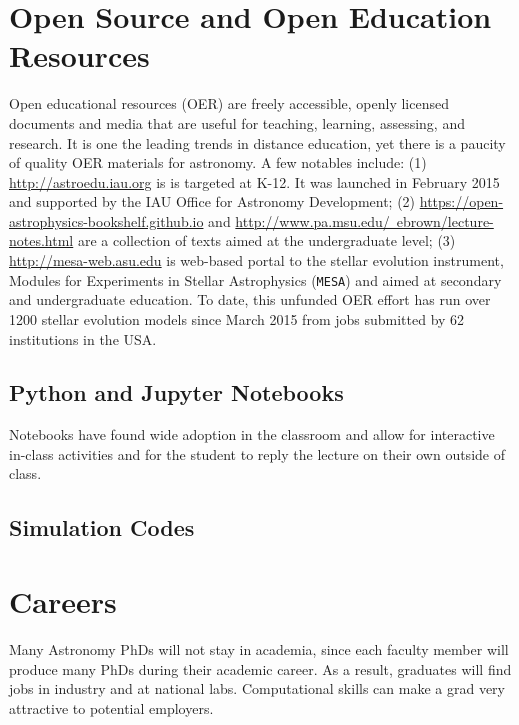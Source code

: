 \documentclass[11pt]{article}
\begin{document}
\section{Open Source and Open Education Resources}
Open educational resources (OER) are freely accessible, openly
licensed documents and media that are useful for teaching, learning,
assessing, and research. It is one the leading trends in distance education,
yet there is a paucity of quality OER materials for astronomy. A few notables
include:
(1) \href{http://astroedu.iau.org}{http://astroedu.iau.org} is 
is targeted at K-12. It was launched in February 2015 and 
supported by the IAU Office for Astronomy Development;
(2) \href{https://open-astrophysics-bookshelf.github.io}{https://open-astrophysics-bookshelf.github.io}
and \href{http://www.pa.msu.edu/~ebrown/lecture-notes.html}{http://www.pa.msu.edu/~ebrown/lecture-notes.html}
are a collection of texts aimed at the undergraduate level; 
(3) \href{http://mesa-web.asu.edu}{http://mesa-web.asu.edu} 
is web-based portal to the stellar evolution instrument, Modules for
Experiments in Stellar Astrophysics ({\tt MESA}) and aimed at 
secondary and undergraduate education. To date, this unfunded OER effort has
run over 1200 stellar evolution models since March 2015 from jobs submitted
by 62 institutions in the USA.



\subsection{Python and Jupyter Notebooks}

Notebooks have found wide adoption in the classroom and allow for
interactive in-class activities and for the student to reply the
lecture on their own outside of class.

\subsection{Simulation Codes}




\section{Careers}

Many Astronomy PhDs will not stay in academia, since each faculty member
will produce many PhDs during their academic career.  As a result, graduates
will find jobs in industry and at national labs.  Computational skills 
can make a grad very attractive to potential employers.
\end{document}
